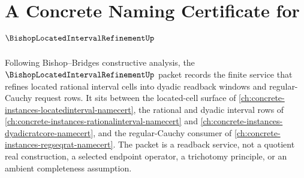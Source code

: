 \chapter{A Concrete Naming Certificate for $\BishopLocatedIntervalRefinementUp$}
\label{ch:concrete-instances-bishop-located-interval-refinement-namecert}

Following Bishop--Bridges constructive analysis, the $\BishopLocatedIntervalRefinementUp$ packet records the finite service that refines located rational interval cells into dyadic readback windows and regular-Cauchy request rows. It sits between the located-cell surface of \autoref{ch:concrete-instances-locatedinterval-namecert}, the rational and dyadic interval rows of \autoref{ch:concrete-instances-rationalinterval-namecert} and \autoref{ch:concrete-instances-dyadicratcore-namecert}, and the regular-Cauchy consumer of \autoref{ch:concrete-instances-regseqrat-namecert}. The packet is a readback service, not a quotient real construction, a selected endpoint operator, a trichotomy principle, or an ambient completeness assumption.

